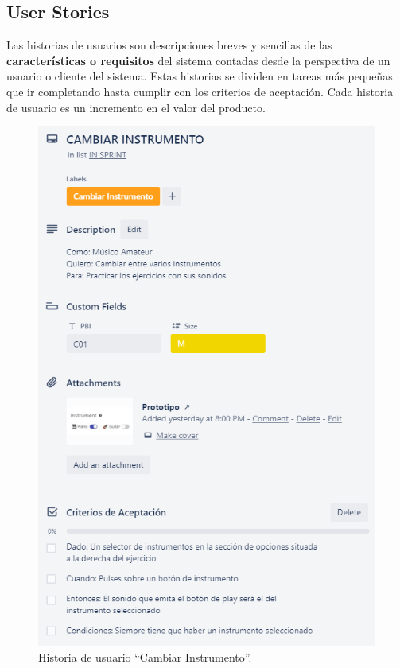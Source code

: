 \documentclass[12pt,twoside,titlepage]{report}
\begin{document}
\subsection{User Stories}

Las historias de usuarios son descripciones breves y sencillas de las \textbf{características o requisitos} del sistema contadas desde la perspectiva de un usuario o cliente del sistema. Estas historias se dividen en tareas más pequeñas que ir completando hasta cumplir con los criterios de aceptación. Cada historia de usuario es un incremento en el valor del producto.

\begin{figure}[H]
    \centering
    \includegraphics[scale=0.7]{Scrum/UserStory}
    \caption{Historia de usuario ``Cambiar Instrumento''.}
    \label{fig:UserStory}
\end{figure}
\end{document}
